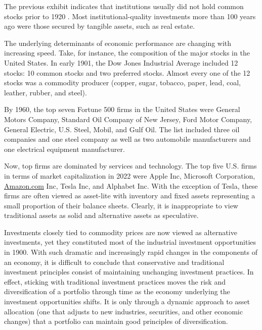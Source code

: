 \documentclass[11pt]{article}
\begin{document}
The previous exhibit indicates that institutions usually did not hold common stocks prior to 1920 . Most institutional-quality investments more than 100 years ago were those secured by tangible assets, such as real estate.

The underlying determinants of economic performance are changing with increasing speed. Take, for instance, the composition of the major stocks in the United States. In early 1901, the Dow Jones Industrial Average included 12 stocks: 10 common stocks and two preferred stocks. Almost every one of the 12 stocks was a commodity producer (copper, sugar, tobacco, paper, lead, coal, leather, rubber, and steel).

By 1960, the top seven Fortune 500 firms in the United States were General Motors Company, Standard Oil Company of New Jersey, Ford Motor Company, General Electric, U.S. Steel, Mobil, and Gulf Oil. The list included three oil companies and one steel company as well as two automobile manufacturers and one electrical equipment manufacturer.

Now, top firms are dominated by services and technology. The top five U.S. firms in terms of market capitalization in 2022 were Apple Inc, Microsoft Corporation, \href{http://Amazon.com}{Amazon.com} Inc, Tesla Inc, and Alphabet Inc. With the exception of Tesla, these firms are often viewed as asset-lite with inventory and fixed assets representing a small proportion of their balance sheets. Clearly, it is inappropriate to view traditional assets as solid and alternative assets as speculative.

Investments closely tied to commodity prices are now viewed as alternative investments, yet they constituted most of the industrial investment opportunities in 1900. With such dramatic and increasingly rapid changes in the components of an economy, it is difficult to conclude that conservative and traditional investment principles consist of maintaining unchanging investment practices. In effect, sticking with traditional investment practices moves the risk and diversification of a portfolio through time as the economy underlying the investment opportunities shifts. It is only through a dynamic approach to asset allocation (one that adjusts to new industries, securities, and other economic changes) that a portfolio can maintain good principles of diversification.
\end{document}
